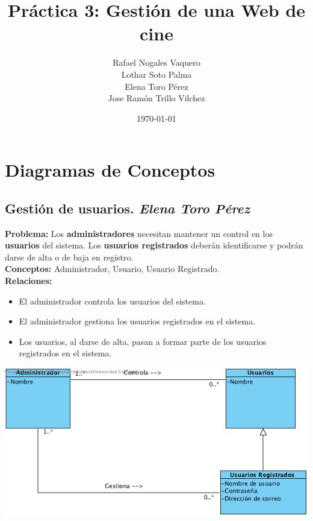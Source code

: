 \documentclass{article}
\title{Práctica 3: Gestión de una Web de cine}
\author{Rafael Nogales Vaquero
\\Lothar Soto Palma
\\Elena Toro Pérez
\\Jose Ramón Trillo Vilchez}
\date{\today}
\begin{document}
\maketitle

\section{Diagramas de Conceptos}
	\subsection*{Gestión de usuarios. \textit{Elena Toro Pérez}}
		\textbf{Problema:} Los \textbf{administradores} necesitan mantener un control en los \textbf{usuarios} del sistema.
Los \textbf{usuarios registrados} deberán identificarse y podrán darse de alta o de baja en registro.\\
\textbf{Conceptos:} Administrador, Usuario, Usuario Registrado.\\
\textbf{	Relaciones:}
	\begin{itemize}
    	\item El administrador controla los usuarios del sistema.
        \item El administrador gestiona los usuarios registrados en el sistema.
        \item Los usuarios, al darse de alta, pasan a formar parte de los usuarios registrados en el sistema.      	
    \end{itemize}
	\includegraphics[width=1\linewidth]{./C-Usuarios}


\end{document}
